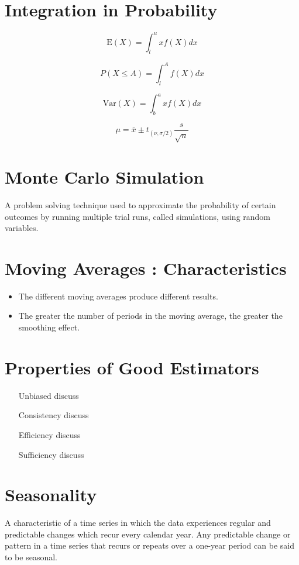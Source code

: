 \section{Integration in Probability}

\[ \mbox{E}(X) = \int^{u}_{l} x f(X) dx \]

\[ P(X \leq A)  = \int^{A}_{l} f(X) dx \]

\[ \mbox{Var}(X) = \int^{a}_{b} x f(X) dx \]


\[ \mu = \bar{x} \pm t_{(\nu,\sigma/2)}\frac{s}{\sqrt{n}}  \]




\section{Monte Carlo Simulation}

A problem solving technique used to approximate the probability of certain outcomes by running multiple trial runs, called simulations, using random variables.
\section{ Moving Averages : Characteristics}
\begin{itemize}
	\item The different moving averages produce different results.
	\item The greater the number of periods in the moving average, the greater the smoothing effect.
\end{itemize}


\section{Properties of Good Estimators}

\begin{itemize}
	\item[Unbiased] discuss
	\item[Consistency] discuss
	\item[Efficiency] discuss
	\item[Sufficiency] discuss
\end{itemize}



\section{Seasonality}
A characteristic of a time series in which the data experiences regular and predictable changes which recur every calendar year. Any predictable change or pattern in a time series that recurs or repeats over a one-year period can be said to be seasonal.

